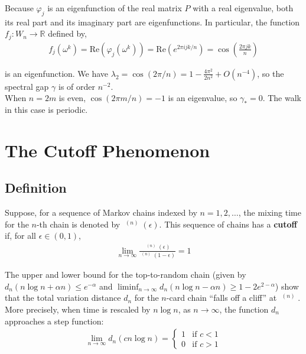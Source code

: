 \documentclass[12pt]{article}
\DeclareMathOperator*{\mix}{t_{\text{mix}}}
\begin{document}
Because $\varphi_j$ is an eigenfunction of the real matrix $P$ with a real eigenvalue, both its real part and its imaginary part are eigenfunctions. In particular, the function $f_j: W_n \to \mathbb{R}$ defined by,
\begin{align*}
f_j(\omega^k) = \text{Re}(\varphi_j(\omega^k)) = \text{Re}(e^{2 \pi i j k/n}) = \cos \left( \frac{2 \pi j k}{n} \right)
\end{align*}

is an eigenfunction. We have $\lambda_2 = \cos(2\pi/n) = 1 - \frac{4\pi^2}{2n^2} + O(n^{-4})$, so the spectral gap $\gamma$ is of order $n^{-2}$.\\

When $n = 2m$ is even, $\cos(2 \pi m/n) = -1$ is an eigenvalue, so $\gamma_* = 0$. The walk in this case is periodic.


\section{The Cutoff Phenomenon}

\subsection{Definition}

Suppose, for a sequence of Markov chains indexed by $n = 1, 2, \ldots$, the mixing time for the $n$-th chain is denoted by $\mix^{(n)}(\epsilon)$. This sequence of chains has a \textbf{cutoff} if, for all $\epsilon \in (0, 1)$,
\begin{align*}
\lim_{n \to \infty} \frac{\mix^{(n)}(\epsilon)}{\mix^{(n)}(1 - \epsilon)} = 1
\end{align*}

The upper and lower bound for the top-to-random chain (given by $d_n(n \log n + \alpha n) \leq e^{-\alpha}$ and $\liminf_{n \to \infty} d_n (n \log n - \alpha n) \geq 1 - 2e^{2 - \alpha}$) show that the total variation distance $d_n$ for the $n$-card chain ``falls off a cliff'' at $\mix^{(n)}$. More precisely, when time is rescaled by $n\log n$, as $n \to \infty$, the function $d_n$ approaches a step function:
\begin{align*}
\lim_{n \to \infty} d_n(cn \log n) = \begin{cases}
1 & \text{if } c < 1\\
0 & \text{if } c > 1
\end{cases}
\end{align*}
\end{document}

